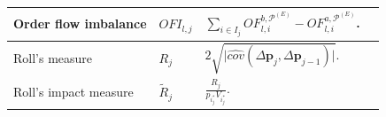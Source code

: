 \documentclass{rQUF2e}
\theoremstyle{plain}
\theoremstyle{definition}
\theoremstyle{remark}
\begin{document}
\begin{longtable}{|p{4cm}|p{2.25cm}|p{5.25cm}|p{2.25cm}|}
    Order flow imbalance                                                                                                                                                   &
    $OFI_{l, j}$                                                                                                                                                           &
    $\sum_{i \in I_j} OF^{b, \mathcal{P}^{(E)}}_{l,i} - OF^{a, \mathcal{P}^{(E)}}_{l,i}$.                                                                                  &
    \citep{cont2013price, kolm2023deep}                                                                                                                                                                                                                                                                                                                                                         \\ \hline

    Roll's measure                                                                                                                                                         &
    $R_j$                                                                                                                                                                  &
    $2 \sqrt{\Big| \hat{cov}(\Delta \mathbf{p}_j, \Delta \mathbf{p}_{j - 1}) \Big|}$.                                                                                      &
    \citep{roll1984simple, easley2021microstructure}                                                                                                                                                                                                                                                                                                                                            \\ \hline

    Roll's impact measure                                                                                                                                                  &
    $\tilde{R}_j$                                                                                                                                                          &
    $\frac{R_j}{p_{i^*_j} V_{i^*_j}}$.                                                                                                                                     &
    \citep{roll1984simple, easley2021microstructure}                                                                                                                                                                                                                                                                                                                                            \\ \hline


\end{longtable}
\end{document}
